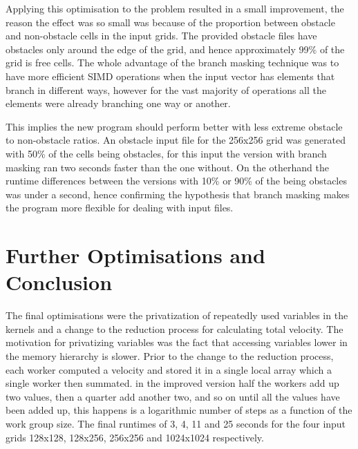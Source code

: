 \documentclass[12pt, a4paper]{article}
\begin{document}
\begin{multicols}{2}
    Applying this optimisation to the problem resulted in a small improvement, the reason the effect was so small was because of the proportion between obstacle and non-obstacle cells in the input grids. The provided obstacle files have obstacles only around the edge of the grid, and hence approximately 99\% of the grid is free cells. The whole advantage of the branch masking technique was to have more efficient SIMD operations when the input vector has elements that branch in different ways, however for the vast majority of operations all the elements were already branching one way or another.

    This implies the new program should perform better with less extreme obstacle to non-obstacle ratios. An obstacle input file for the 256x256 grid was generated with 50\% of the cells being obstacles, for this input the version with branch masking ran two seconds faster than the one without. On the otherhand the runtime differences between the versions with 10\% or 90\% of the being obstacles was under a second, hence confirming the hypothesis that branch masking makes the program more flexible for dealing with input files.

  \end{multicols}
  \vspace{-.8cm}

  \section*{Further Optimisations and Conclusion}

  The final optimisations were the privatization of repeatedly used variables in the kernels and a change to the reduction process for calculating total velocity. The motivation for privatizing variables was the fact that accessing variables lower in the memory hierarchy is slower. Prior to the change to the reduction process, each worker computed a velocity and stored it in a single local array which a single worker then summated. in the improved version half the workers add up two values, then a quarter add another two, and so on until all the values have been added up, this happens is a logarithmic number of steps as a function of the work group size. The final runtimes of 3, 4, 11 and 25 seconds for the four input grids 128x128, 128x256, 256x256 and 1024x1024 respectively.
\end{document}
